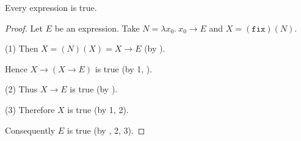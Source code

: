 \documentclass[english]{article}
\newcommand{\varzero}{x_0}
\newcommand{\abs}[2]{\lambda#1.\ #2}
\newcommand{\app}[2]{(#1)(#2)}
\newcommand{\fix}{\texttt{fix}}
\begin{document}
  \begin{forthel}
    \begin{theorem*}\label{curry_paradox}
      Every expression is true.
    \end{theorem*}
    \begin{proof}
      Let $E$ be an expression.
      Take $N = \abs{\varzero}{\varzero \rightarrow E}$ and $X = \app{\fix}{N}.$
  
      (1) Then $X = \app{N}{X} = X \rightarrow E$ (by ).
  
      Hence $X \rightarrow (X \rightarrow E)$ is true (by 1, ).
  
      (2) Thus $X \rightarrow E$ is true (by ).
  
      (3) Therefore $X$ is true (by 1, 2).
  
      Consequently $E$ is true (by , 2, 3).
    \end{proof}
  \end{forthel}

  \printbibliography
\end{document}
